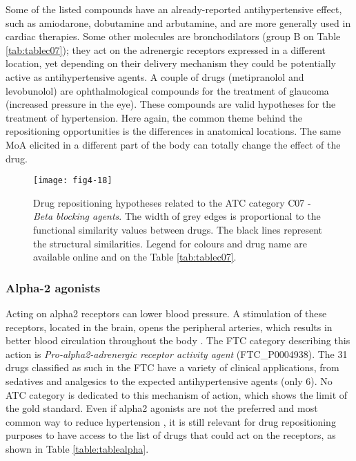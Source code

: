Some of the listed compounds have an already-reported antihypertensive effect, such as amiodarone, dobutamine and arbutamine, and are more generally used in cardiac therapies. Some other molecules are bronchodilators (group B on Table \ref{tab:tablec07}); they act on the adrenergic receptors expressed in a different location, yet depending on their delivery mechanism they could be potentially active as antihypertensive agents. A couple of drugs (metipranolol and levobunolol) are ophthalmological compounds for the treatment of glaucoma (increased pressure in the eye). These compounds are valid hypotheses for the treatment of hypertension. Here again, the common theme behind the repositioning opportunities is the differences in anatomical locations. The same MoA elicited in a different part of the body can totally change the effect of the drug.

\begin{figure}[H]
    \centering
    \texttt{[image: fig4-18]}
    \caption{Drug repositioning hypotheses related to the ATC category C07 - \emph{Beta blocking agents}. The width of grey edges is proportional to the functional similarity values between drugs. The black lines represent the structural similarities. Legend for colours and drug name are available online and on the Table \ref{tab:tablec07}.}
    \label{fig4-18}
\end{figure}

\subsubsection{Alpha-2 agonists}
Acting on alpha2 receptors can lower blood pressure. A stimulation of these receptors, located in the brain, opens the peripheral arteries, which results in better blood circulation throughout the body \citep{swedberg2005task}. The FTC category describing this action is \emph{Pro-alpha2-adrenergic receptor activity agent} (FTC\_P0004938). The 31 drugs classified as such in the FTC have a variety of clinical applications, from sedatives and analgesics to the expected antihypertensive agents (only 6).
No ATC category is dedicated to this mechanism of action, which shows the limit of the gold standard. Even if alpha2 agonists are not the preferred and most common way to reduce hypertension \citep{nelson2010drug}, it is still relevant for drug repositioning purposes to have access to the list of drugs that could act on the receptors, as shown in Table \ref{table:tablealpha}.

